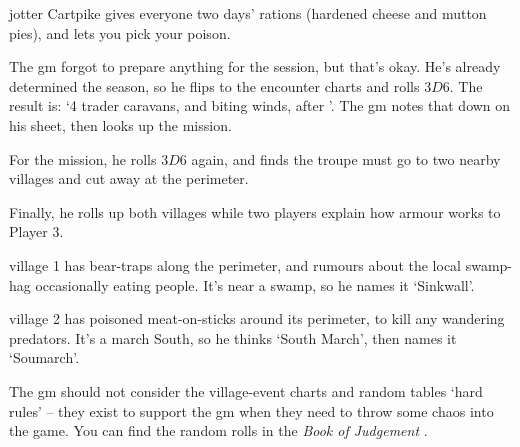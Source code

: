 \begin{multicols}{2}
{\begin{description}
    \Gls{jotter} Cartpike gives everyone two days' rations (hardened cheese and mutton pies), and lets you pick your poison.
  \end{description}

}{
  The \gls{gm} forgot to prepare anything for the session, but that's okay.
  He's already determined the season, so he flips to the encounter charts and rolls $3D6$.
  The result is: `4 trader caravans, and biting winds, after '.
  The \gls{gm} notes that down on his sheet, then looks up the mission.

  For the mission, he rolls $3D6$ again, and finds the troupe must go to two nearby \glspl{village} and cut away at the perimeter.

  Finally, he rolls up both \glspl{village} while two players explain how armour works to Player 3.

  \Gls{village} 1 has bear-traps along the perimeter, and rumours about the local swamp-hag occasionally eating people.
  It's near a swamp, so he names it `Sinkwall'.

  \Gls{village} 2 has poisoned meat-on-sticks around its perimeter, to kill any wandering predators.
  It's a march South, so he thinks `South March', then names it `Soumarch'.

  The \gls{gm} should not consider the \gls{village}-event charts and random tables `hard rules' -- they exist to support the \gls{gm} when they need to throw some chaos into the game.
  You can find the random rolls in the \textit{Book of Judgement}%
  \iftoggle{judgement}{, \autoref{encounters}, \autopageref{encounters}}{}.
}

\end{multicols}
